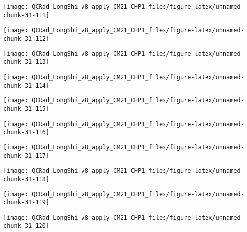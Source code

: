 \documentclass[
  10pt,
  a4paper,oneside]{article}
\begin{document}
\begin{center}\texttt{[image: QCRad\_LongShi\_v8\_apply\_CM21\_CHP1\_files/figure-latex/unnamed-chunk-31-111]} \end{center}

\begin{center}\texttt{[image: QCRad\_LongShi\_v8\_apply\_CM21\_CHP1\_files/figure-latex/unnamed-chunk-31-112]} \end{center}

\begin{center}\texttt{[image: QCRad\_LongShi\_v8\_apply\_CM21\_CHP1\_files/figure-latex/unnamed-chunk-31-113]} \end{center}

\begin{center}\texttt{[image: QCRad\_LongShi\_v8\_apply\_CM21\_CHP1\_files/figure-latex/unnamed-chunk-31-114]} \end{center}

\begin{center}\texttt{[image: QCRad\_LongShi\_v8\_apply\_CM21\_CHP1\_files/figure-latex/unnamed-chunk-31-115]} \end{center}

\begin{center}\texttt{[image: QCRad\_LongShi\_v8\_apply\_CM21\_CHP1\_files/figure-latex/unnamed-chunk-31-116]} \end{center}

\begin{center}\texttt{[image: QCRad\_LongShi\_v8\_apply\_CM21\_CHP1\_files/figure-latex/unnamed-chunk-31-117]} \end{center}

\begin{center}\texttt{[image: QCRad\_LongShi\_v8\_apply\_CM21\_CHP1\_files/figure-latex/unnamed-chunk-31-118]} \end{center}

\begin{center}\texttt{[image: QCRad\_LongShi\_v8\_apply\_CM21\_CHP1\_files/figure-latex/unnamed-chunk-31-119]} \end{center}

\begin{center}\texttt{[image: QCRad\_LongShi\_v8\_apply\_CM21\_CHP1\_files/figure-latex/unnamed-chunk-31-120]} \end{center}
\end{document}
